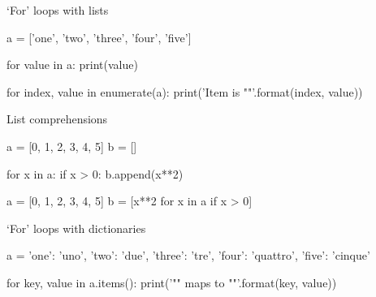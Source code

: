 \begin{frame}[fragile]{`For' loops with lists}
    \begin{py3}
        a = ['one', 'two', 'three', 'four', 'five']

        for value in a:
            print(value)

        for index, value in enumerate(a):
            print('Item {} is "{}"'.format(index, value))
    \end{py3}
\end{frame}

\begin{frame}[fragile]{List comprehensions}
    \begin{py3}
        a = [0, 1, 2, 3, 4, 5]
        b = []

        for x in a:
            if x > 0:
                b.append(x**2)
    \end{py3}
    \vfill
    \begin{py3}
        a = [0, 1, 2, 3, 4, 5]
        b = [x**2 for x in a if x > 0]
    \end{py3}
\end{frame}

\begin{frame}[fragile]{`For' loops with dictionaries}
    \begin{py3}
        a = {
            'one': 'uno',
            'two': 'due',
            'three': 'tre',
            'four': 'quattro',
            'five': 'cinque'
        }

        for key, value in a.items():
            print('"{}" maps to "{}"'.format(key, value))
    \end{py3}
\end{frame}

